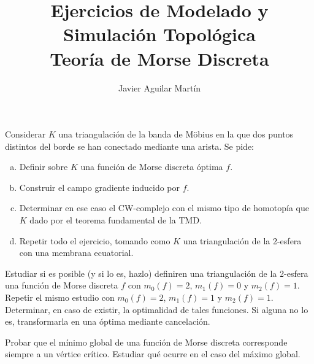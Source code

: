 \documentclass[twoside]{article}
\begin{document}
\title{Ejercicios de Modelado y Simulación Topológica\\ Teoría de Morse Discreta}
\author{Javier Aguilar Martín}
\maketitle

\begin{ejercicio}{1}
Considerar $K$ una triangulación de la banda de Möbius en la que dos puntos distintos del borde se han conectado mediante una arista. Se pide:
\begin{enumerate}[(a)]
\item Definir sobre $K$ una función de Morse discreta óptima $f$.
\item Construir el campo gradiente inducido por $f$. 
\item Determinar en ese caso el CW-complejo con el mismo tipo de homotopía que $K$ dado por el teorema fundamental de la TMD. 
\item Repetir todo el ejercicio, tomando como $K$ una triangulación de la 2-esfera con una membrana ecuatorial. 
\end{enumerate}
\end{ejercicio}
\begin{solucion}

\end{solucion}
\newpage

\begin{ejercicio}{2}
Estudiar si es posible (y si lo es, hazlo) definiren una triangulación de la 2-esfera una función de Morse discreta $f$ con $m_0(f)=2$, $m_1(f)=0$ y $m_2(f)=1$. Repetir el mismo estudio con $m_0(f)=2$, $m_1(f)=1$ y $m_2(f)=1$. Determinar, en caso de existir, la optimalidad de tales funciones. Si alguna no lo es, transformarla en una óptima mediante cancelación. 
\end{ejercicio}
\begin{solucion}

\end{solucion}

\newpage

\begin{ejercicio}{3}
Probar que el mínimo global de una función de Morse discreta corresponde siempre a un vértice crítico. Estudiar qué ocurre en el caso del máximo global.
\end{ejercicio}
\begin{solucion}

\end{solucion}
\end{document}
